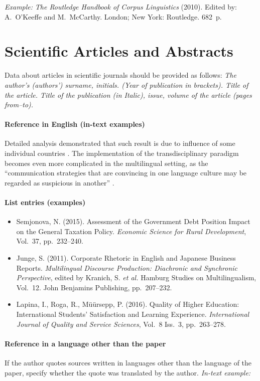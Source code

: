 \emph{Example:} \emph{The Routledge Handbook of Corpus Linguistics} (2010). Edited by: A.~O'Keeffe and M.~McCarthy. London; New York: Routledge. 682~p.

\section{Scientific Articles and Abstracts}

Data about articles in scientific journals should be provided as follows: \emph{The author's (authors') surname, initials. (Year of publication in brackets). Title of the article. Title of the publication (in Italic), issue, volume of the article (pages from--to).}

\paragraph{Reference in English (in-text examples)} Detailed analysis demonstrated that such result is due to influence of some individual countries \parencite[237]{semjonova2015}. The implementation of the transdisciplinary paradigm becomes even more complicated in the multilingual setting, as the ``communication strategies that are convincing in one language culture may be regarded as suspicious in another'' \parencite[209]{junge2011}.

\paragraph{List entries (examples)}
\begin{itemize}
  \item Semjonova, N. (2015). Assessment of the Government Debt Position Impact on the General Taxation Policy. \emph{Economic Science for Rural Development}, Vol.~37, pp.~232--240.
  \item Junge, S. (2011). Corporate Rhetoric in English and Japanese Business Reports. \emph{Multilingual Discourse Production: Diachronic and Synchronic Perspective}, edited by Kranich, S. \emph{et al.} Hamburg Studies on Multilingualism, Vol.~12. John Benjamins Publishing, pp.~207--232.
  \item Lapina, I., Roga, R., Müürsepp, P. (2016). Quality of Higher Education: International Students' Satisfaction and Learning Experience. \emph{International Journal of Quality and Service Sciences}, Vol.~8 Iss.~3, pp.~263--278.
\end{itemize}

\paragraph{Reference in a language other than the paper} If the author quotes sources written in languages other than the language of the paper, specify whether the quote was translated by the author. \emph{In-text example:}

